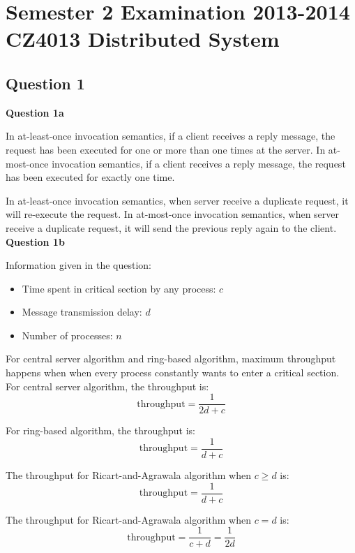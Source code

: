\documentclass[11pt,a4paper]{report}
\begin{document}
\chapter{Semester 2 Examination 2013-2014\\CZ4013 Distributed System}

\begin{multicols*}{2}

\section{Question 1}

\noindent \textbf{Question 1a}

\noindent In at-least-once invocation semantics, if a client receives a reply message, the request has been executed for one or more than one times at the server. In at-most-once invocation semantics, if a client receives a reply message, the request has been executed for exactly one time. 

\noindent In at-least-once invocation semantics, when server receive a duplicate request, it will re-execute the request. In at-most-once invocation semantics, when server receive a duplicate request, it will send the previous reply again to the client.\\

\noindent \textbf{Question 1b}

\noindent Information given in the question:
\begin{itemize}
  \item Time spent in critical section by any process: $c$
  \item Message transmission delay: $d$
  \item Number of processes: $n$
\end{itemize}

\noindent For central server algorithm and ring-based algorithm, maximum throughput happens when when every process constantly wants to enter a critical section.\\

\noindent For central server algorithm, the throughput is:
$$\text{throughput}=\frac{1}{2d + c}$$

\noindent For ring-based algorithm, the throughput is:
$$\text{throughput}=\frac{1}{d + c}$$

\noindent The throughput for Ricart-and-Agrawala algorithm when $c\ge d$ is:
$$\text{throughput}=\frac{1}{d + c}$$

\noindent The throughput for Ricart-and-Agrawala algorithm when $c = d$ is:
$$\text{throughput}=\frac{1}{c + d} = \frac{1}{2d}$$


\end{multicols*}
\end{document}
